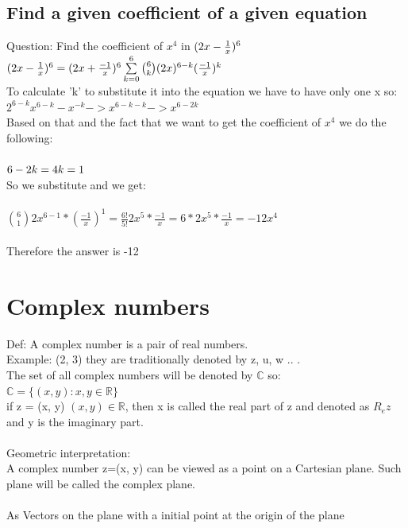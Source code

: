 \documentclass{report}
\begin{document}
\subsection{Find a given coefficient of a given equation}
Question: Find the coefficient of $x^4$ in $(2x - \frac{1}{x})^6 \\ \\$
\\
$(2x - \frac{1}{x})^6 = (2x + \frac{-1}{x})^6 \\  \\
\sum\limits_{k=0}^6 \binom{6}{k}(2x)^{6-k}(\frac{-1}{x})^k 
$\\
To calculate 'k' to substitute it into the equation we have to have only one x so: \\
$
2^{6-k}x^{6-k}-x^{-k} -> x^{6-k-k} -> x^{6-2k}
$\\
Based on that and the fact that we want to get the coefficient of $x^4$ we do the following: \\
\\
$
6-2k = 4 \\
k = 1
$\\
So we substitute and we get: \\
\\
$\binom{6}{1}2x^{6-1} * (\frac{-1}{x})^1 = \frac{6!}{5!}2x^5 * \frac{-1}{x} =  6 * 2x^5  * \frac{-1}{x} = -12x^4 $ \\ 
\\
Therefore the answer is -12 


\section{Complex numbers}
Def: A complex number is a pair of real numbers.\\
Example: (2, 3) they are traditionally denoted by z, u, w .. . \\
The set of all complex numbers will be denoted by $\mathbb{C}$ so: \\
$\mathbb{C} = \{(x, y): x, y \in \mathbb{R} \}$ \\
if z = (x, y) $(x, y) \in \mathbb{R}$, then x is called the real part of z and denoted as $R_ez$ and y is the imaginary part.\\ \\
Geometric interpretation: \\
A complex number z=(x, y) can be viewed as a point on a Cartesian plane. Such plane will be called the complex plane. \\ \\
As Vectors on the plane with a initial point at the origin of the plane \\ \\
\end{document}
